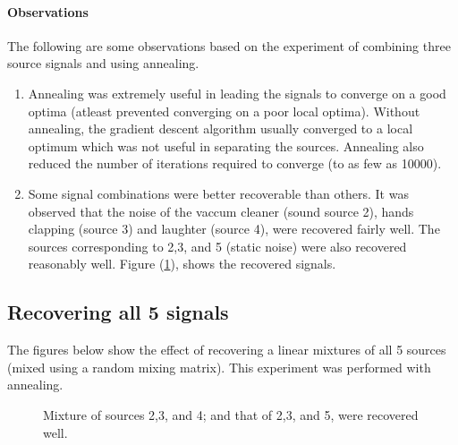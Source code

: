 \documentclass[11pt]{article}
\begin{document}
\paragraph{Observations}
The following are some observations based on the experiment of combining three source signals and using annealing.
\begin{enumerate}
\item Annealing was extremely useful in leading the signals to converge on a good optima (atleast prevented converging on a poor local optima). Without annealing, the gradient descent algorithm usually converged to a local optimum which was not useful in separating the sources. Annealing also reduced the number of iterations required to converge (to as few as 10000).
\item Some signal combinations were better recoverable than others. It was observed that the noise of the vaccum cleaner (sound source 2), hands clapping (source 3) and laughter (source 4), were recovered fairly well. The sources corresponding to 2,3, and 5 (static noise) were also recovered reasonably well. Figure (\ref{fig:exp2}), shows the recovered signals.
\end{enumerate}

\subsection{Recovering all 5 signals}
The figures below show the effect of recovering a linear mixtures of all 5 sources (mixed using a random mixing matrix). This experiment was performed with annealing.
\begin{figure}[hbt]
\begin{center}
\end{center}
\caption{Mixture of sources 2,3, and 4; and that of 2,3, and 5, were recovered well.}\label{fig:exp2}
\end{figure}
\end{document}
